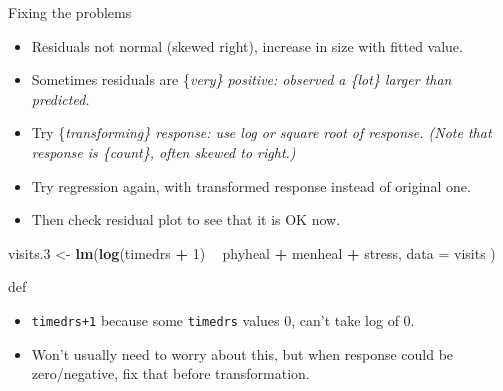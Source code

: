 \documentclass[ignorenonframetext,]{beamer}
\newenvironment{Shaded}{\begin{snugshade}}{\end{snugshade}}
\newcommand{\DataTypeTok}[1]{\textcolor[rgb]{0.13,0.29,0.53}{#1}}
\newcommand{\DecValTok}[1]{\textcolor[rgb]{0.00,0.00,0.81}{#1}}
\newcommand{\FloatTok}[1]{\textcolor[rgb]{0.00,0.00,0.81}{#1}}
\newcommand{\KeywordTok}[1]{\textcolor[rgb]{0.13,0.29,0.53}{\textbf{#1}}}
\newcommand{\NormalTok}[1]{#1}
\newcommand{\OperatorTok}[1]{\textcolor[rgb]{0.81,0.36,0.00}{\textbf{#1}}}
\newcommand{\StringTok}[1]{\textcolor[rgb]{0.31,0.60,0.02}{#1}}
\begin{document}
\begin{frame}[fragile]{Fixing the problems}
\protect\hypertarget{fixing-the-problems}{}

\begin{itemize}
\item
  Residuals not normal (skewed right), increase in size with fitted
  value.
\item
  Sometimes residuals are \{\em very\} positive: observed a \{\em lot\}
  larger than predicted.
\item
  Try \{\em  transforming\} response: use log or square root of
  response. (Note that response is \{\em count\}, often skewed to
  right.)
\item
  Try regression again, with transformed response instead of original
  one.
\item
  Then check residual plot to see that it is OK now.
\end{itemize}

\begin{Shaded}
\begin{Highlighting}[]
\NormalTok{visits}\FloatTok{.3}\NormalTok{ <-}\StringTok{ }\KeywordTok{lm}\NormalTok{(}\KeywordTok{log}\NormalTok{(timedrs }\OperatorTok{+}\StringTok{ }\DecValTok{1}\NormalTok{) }\OperatorTok{~}\StringTok{ }\NormalTok{phyheal }\OperatorTok{+}\StringTok{ }\NormalTok{menheal }\OperatorTok{+}\StringTok{ }\NormalTok{stress,}
  \DataTypeTok{data =}\NormalTok{ visits}
\NormalTok{)}
\end{Highlighting}
\end{Shaded}

def

\begin{itemize}
\item
  \texttt{timedrs+1} because some \texttt{timedrs} values 0, can't take
  log of 0.
\item
  Won't usually need to worry about this, but when response could be
  zero/negative, fix that before transformation.
\end{itemize}

\end{frame}
\end{document}
